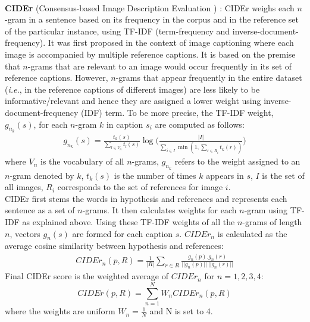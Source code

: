 \\
\textbf{CIDEr} (Consensus-based Image Description Evaluation ) : CIDEr weighs each $n$-gram in a sentence based on its frequency in the corpus and in the reference set of the particular instance, using TF-IDF (term-frequency and inverse-document-frequency). It was first proposed in the context of image captioning where each image is accompanied by multiple reference captions. It is based on the premise that $n$-grams that are relevant to an image would occur frequently in its set of reference captions. 
However, $n$-grams that appear frequently in the entire dataset (\textit{i.e.}, in the reference captions of different images) are less likely to be informative/relevant and hence they are assigned a lower weight using inverse-document-frequency (IDF) term. To be more precise, the TF-IDF weight, $g_{n_k}(s)$, for each $n$-gram $k$ in caption $s_i$ are computed as follows: 
\begin{align*}
    g_{n_k}(s) = \frac{t_k(s)}{\sum_{l \in V_n}t_l(s)} \log \Bigg( \frac{|I|}{\sum_{i \in I}\min(1,\sum_{r \in R_i}t_k(r))} \Bigg)
\end{align*}
where $V_n$ is the vocabulary of all $n$-grams, $g_{n_k}$ refers to the weight assigned to an $n$-gram denoted by $k$, $t_k(s)$ is the number of times $k$ appears in $s$, $I$ is the set of all images, $R_i$ corresponds to the set of references for image $i$.\\
CIDEr first stems the words in hypothesis and references and represents each sentence as a set of $n$-grams. It then calculates weights for each $n$-gram using TF-IDF as explained above.
Using these TF-IDF weights of all the $n$-grams of length $n$, vectors $g_n(s)$ are formed for each caption $s$. $CIDEr_n$ is calculated as the average cosine similarity between hypothesis and references:
\begin{align*}
    CIDEr_n(p, R) = \frac{1}{|R|}\sum_{r \in R}\frac{g_n(p).g_n(r)}{||g_n(p)||~||g_n(r)||}
\end{align*}
Final CIDEr score is the weighted average of $CIDEr_n$ for $n = 1,2,3,4$:
$$ CIDEr(p,R) = \sum_{n=1}^N W_n CIDEr_n(p,R) $$
where the weights are uniform $W_n = \frac{1}{N}$ and N is set to 4.\\
